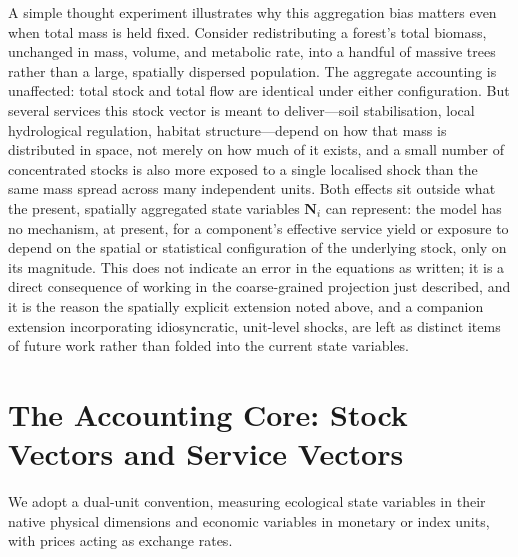 \documentclass[twocolumn,10pt]{article}
\begin{document}
A simple thought experiment illustrates why this aggregation bias matters even when total mass is held fixed. Consider redistributing a forest's total biomass, unchanged in mass, volume, and metabolic rate, into a handful of massive trees rather than a large, spatially dispersed population. The aggregate accounting is unaffected: total stock and total flow are identical under either configuration. But several services this stock vector is meant to deliver---soil stabilisation, local hydrological regulation, habitat structure---depend on how that mass is distributed in space, not merely on how much of it exists, and a small number of concentrated stocks is also more exposed to a single localised shock than the same mass spread across many independent units. Both effects sit outside what the present, spatially aggregated state variables $\mathbf{N}_i$ can represent: the model has no mechanism, at present, for a component's effective service yield or exposure to depend on the spatial or statistical configuration of the underlying stock, only on its magnitude. This does not indicate an error in the equations as written; it is a direct consequence of working in the coarse-grained projection just described, and it is the reason the spatially explicit extension noted above, and a companion extension incorporating idiosyncratic, unit-level shocks, are left as distinct items of future work rather than folded into the current state variables.

\section{The Accounting Core: Stock Vectors and Service Vectors}
\label{sec:accounting-core}
We adopt a dual-unit convention, measuring ecological state variables in their native physical dimensions and economic variables in monetary or index units, with prices acting as exchange rates.
\end{document}
